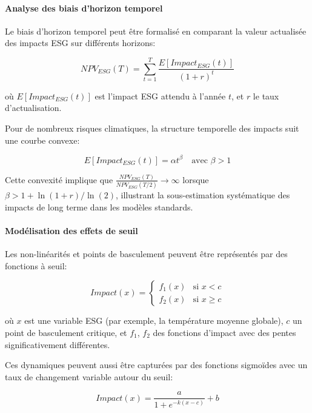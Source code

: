 \paragraph{Analyse des biais d'horizon temporel}
Le biais d'horizon temporel peut être formalisé en comparant la valeur actualisée des impacts ESG sur différents horizons:

\begin{equation}
NPV_{ESG}(T) = \sum_{t=1}^{T} \frac{E[Impact_{ESG}(t)]}{(1+r)^t}
\end{equation}

où $E[Impact_{ESG}(t)]$ est l'impact ESG attendu à l'année $t$, et $r$ le taux d'actualisation.

Pour de nombreux risques climatiques, la structure temporelle des impacts suit une courbe convexe:

\begin{equation}
E[Impact_{ESG}(t)] = \alpha t^\beta \quad \text{avec } \beta > 1
\end{equation}

Cette convexité implique que $\frac{NPV_{ESG}(T)}{NPV_{ESG}(T/2)} \to \infty$ lorsque $\beta > 1+\ln(1+r)/\ln(2)$, illustrant la sous-estimation systématique des impacts de long terme dans les modèles standards.

\paragraph{Modélisation des effets de seuil}
Les non-linéarités et points de basculement peuvent être représentés par des fonctions à seuil:

\begin{equation}
Impact(x) = 
\begin{cases}
f_1(x) & \text{si } x < c \\
f_2(x) & \text{si } x \geq c
\end{cases}
\end{equation}

où $x$ est une variable ESG (par exemple, la température moyenne globale), $c$ un point de basculement critique, et $f_1$, $f_2$ des fonctions d'impact avec des pentes significativement différentes.

Ces dynamiques peuvent aussi être capturées par des fonctions sigmoïdes avec un taux de changement variable autour du seuil:

\begin{equation}
Impact(x) = \frac{a}{1 + e^{-k(x-c)}} + b
\end{equation}

